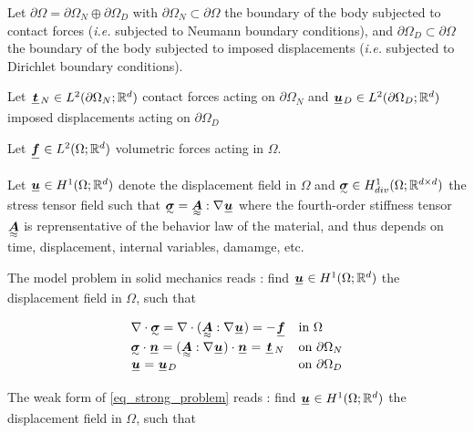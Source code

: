 \documentclass[fleqn]{article}
\begin{document}
        Let $\partial \Omega = \partial \Omega_N \oplus \partial \Omega_D$ with $\partial \Omega_N \subset \partial \Omega$ the boundary of the body subjected to contact forces (\textit{i.e.} subjected to Neumann boundary conditions), and $\partial \Omega_D \subset \partial \Omega$ the boundary of the body subjected to imposed displacements (\textit{i.e.} subjected to Dirichlet boundary conditions).
        \par

        Let $\tensori{t}\subscript{N} \in L^2(\partial \Omega_N;\Rd)$ contact forces acting on $\partial \Omega_N$ and $\tensori{u}\subscript{D} \in L^2(\partial \Omega_D;\Rd)$ imposed displacements acting on $\partial \Omega_D$
        \par

        Let $\tensori{f} \in L^2(\Omega; \Rd)$ volumetric forces acting in $\Omega$.
        \par

        Let $\tensori{u} \in \Hone$ denote the displacement field in $\Omega$ and $\tensorii{\sigma} \in \Hdiv$ the stress tensor field such that $\tensorii{\sigma} = \tensoriv{A} : \nabla \tensori{u}$ where the fourth-order stiffness tensor $\tensoriv{A}$ is reprensentative of the behavior law of the material, and thus depends on time, displacement, internal variables, damamge, etc.
        \par

        The model problem in solid mechanics reads : find $\tensori{u} \in \Hone$ the displacement field in $\Omega$, such that

        \begin{equation}
          \begin{array}{ll}
            \nabla \cdot \tensorii{\sigma} = \nabla \cdot (\tensoriv{A} : \nabla \tensori{u}) =  - \tensori{f} & \mbox{in $\Omega$}
            \\
            \tensorii{\sigma} \cdot \tensori{n} = (\tensoriv{A} : \nabla \tensori{u}) \cdot \tensori{n} = \tensori{t}\subscript{N} & \mbox{on $\partial \Omega_N$}
            \\
            \tensori{u} = \tensori{u} \subscript{D} & \mbox{on $\partial \Omega_D$}
          \end{array}
          \label{eq_strong_problem}
        \end{equation}
        \par

        The weak form of \eqref{eq_strong_problem} reads : find $\tensori{u} \in \Hone$ the displacement field in $\Omega$, such that
\end{document}
